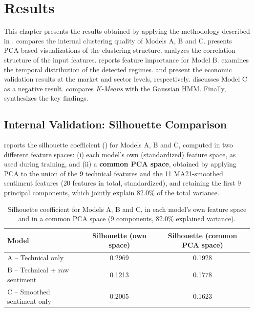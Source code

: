 \chapter{Results}
\label{ch:results}

This chapter presents the results obtained by applying the methodology
described in . 
compares the internal clustering quality of Models A, B and C.
 presents PCA-based visualizations of the
clustering structure.  analyzes the
correlation structure of the input features. 
reports feature importance for Model B.
 examines the temporal distribution of the
detected regimes.  and
 present the economic validation results at
the market and sector levels, respectively. 
discusses Model C as a negative result.  compares
\textit{K-Means} with the Gaussian HMM. Finally,
 synthesizes the key findings.

\section{Internal Validation: Silhouette Comparison}
\label{sec:results-silhouette}

 reports the silhouette coefficient
() for Models A, B and C, computed in two
different feature spaces: (i) each model's own (standardized) feature
space, as used during training, and (ii) a \textbf{common PCA space},
obtained by applying PCA to the union of the 9 technical features and the
11 MA21-smoothed sentiment features (20 features in total, standardized),
and retaining the first 9 principal components, which jointly explain
82.0\% of the total variance.

\begin{table}[H]
\centering
\caption{Silhouette coefficient for Models A, B and C, in each model's own feature space and in a common PCA space (9 components, 82.0\% explained variance).}
\label{tab:silhouette-comparison}
\begin{tabular}{lcc}
\toprule
\textbf{Model} & \textbf{Silhouette (own space)} & \textbf{Silhouette (common PCA space)} \\
\midrule
A -- Technical only             & 0.2969 & 0.1928 \\
B -- Technical + raw sentiment  & 0.1213 & 0.1778 \\
C -- Smoothed sentiment only    & 0.2005 & 0.1623 \\
\bottomrule
\end{tabular}
\end{table}

